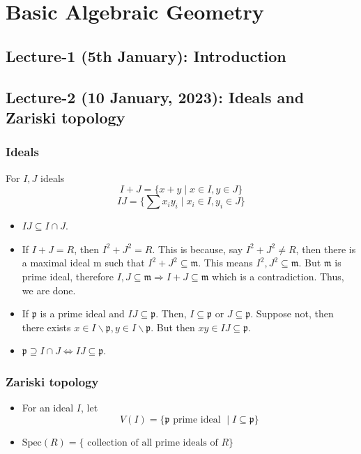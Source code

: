 \documentclass[oneside, 12pt, ]{scrbook}
\theoremstyle{theorem}
\begin{document}
\part{Basic Algebraic Geometry}

\chapter{Lecture-1 (5th January): Introduction}

\chapter{Lecture-2 (10 January, 2023): Ideals and Zariski topology}

\section{Ideals}
For $I,J$ ideals $$I+J = \{x+y \mid x\in I, y\in J\}$$ $$IJ = \{\sum x_{i}y_{i} \mid x_{i} \in I, y_{i} \in J\}$$

\begin{itemize}
\item $IJ \subseteq I \cap J$.
\item If $I+J = R$, then $I^2 + J^2 = R$. This is because, say $I^2 + J^2 \neq R$, then there is a maximal ideal $\mathrm{m}$ such that $I^2 + J^2 \subseteq \mathfrak{m}$. This means $I^2, J^2 \subseteq \mathfrak{m}$. But $\mathfrak{m}$ is prime ideal, therefore $I,J \subseteq \mathfrak{m} \Rightarrow I+J \subseteq \mathfrak{m}$ which is a contradiction. Thus, we are done. 
\item If $\mathfrak{p}$ is a prime ideal and $IJ \subseteq \mathfrak{p}$. Then, $I \subseteq \mathfrak{p}$ or $J \subseteq \mathfrak{p}$. Suppose not, then there exists $x \in I \backslash \mathfrak{p} , y \in I \backslash \mathfrak{p}$. But then $xy \in IJ \subseteq \mathfrak{p}$.
\item $\mathfrak{p} \supseteq I \cap J \Leftrightarrow IJ \subseteq \mathfrak{p}$.
\end{itemize}

\section{Zariski topology}

\begin{definition}
\begin{itemize}
\item For an ideal $I$, let $$V(I) = \{\mathfrak{p} \text{ prime ideal }\mid I \subseteq \mathfrak{p}\}$$
\item $\mathrm{Spec}(R)=\{ \text{ collection of all prime ideals of }R\}$
\end{itemize}
\end{definition}
\end{document}
